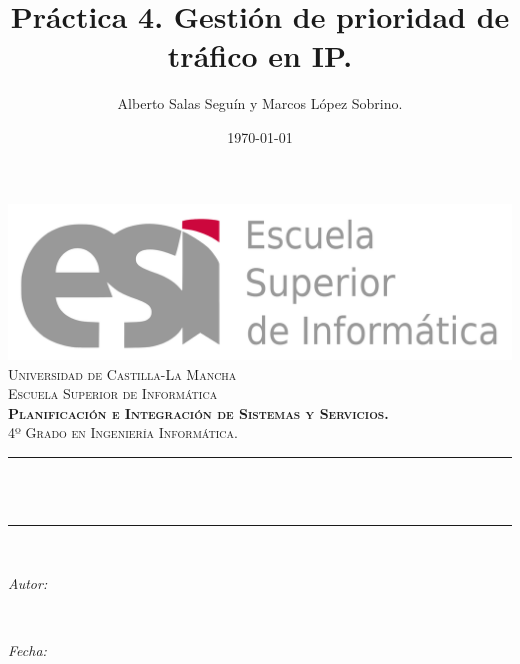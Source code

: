 \documentclass[11pt]{article}
\title{Práctica 4. Gestión de prioridad de tráfico en IP.}							%
\author{Alberto Salas Seguín y Marcos López Sobrino.}							%
\date{\today}											%
\makeatletter
\newcommand{\subject}{Planificación e Integración de Sistemas y Servicios.}						%
\newcommand{\course}{4º Grado en Ingeniería Informática.}		%
\newcommand{\dateText}{Fecha:}
\newcommand{\dateText}{Date:}
\let\thetitle\@title
\let\theauthor\@author
\let\thedate\@date
\makeatother
\begin{document}
\begin{titlepage}
	\centering
    \includegraphics[scale = 0.25]{esilogo.png}\\[1.0 cm]	%
    \textsc{\LARGE Universidad de Castilla-La Mancha}\\[0.5 cm]	%
    \textsc{\LARGE Escuela Superior de Informática}\\[2.0 cm]
	\textsc{\Large \textbf{\subject}}\\[0.5 cm]				%
	\textsc{\large \course}\\[0.5 cm]						%
	\rule{\linewidth}{0.2 mm} \\[0.4 cm]
	{ \huge \bfseries \thetitle}\\
	\rule{\linewidth}{0.2 mm} \\[1.5 cm]
	
	\begin{minipage}{0.4\textwidth}
		\begin{flushleft} \large
			\emph{Autor:}\\
			\textbf{\theauthor}
			\end{flushleft}
			\end{minipage}~
			\begin{minipage}{0.4\textwidth}
			\begin{flushright} \large
			\emph{\dateText} \\
			\thedate
		\end{flushright}
	\end{minipage}\\[1.5 cm]
 
	\vfill
	
\end{titlepage}

\tableofcontents
\newpage
\end{document}
